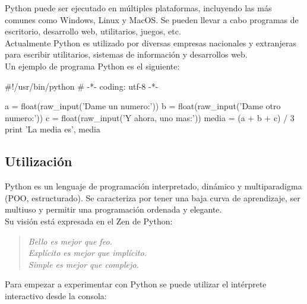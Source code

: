 Python puede ser ejecutado en múltiples plataformas, incluyendo las más comunes como Windows, Linux y MacOS. Se pueden llevar a cabo programas de escritorio, desarrollo web, utilitarios, juegos, etc.\\

Actualmente Python es utilizado por diversas empresas nacionales y extranjeras para escribir utilitarios, sistemas de información y desarrollos web.\\

Un ejemplo de programa Python es el siguiente:\\

\begin{pyglist}
#!/usr/bin/python
# -*- coding: utf-8 -*-

a = float(raw_input('Dame un numero:'))
b = float(raw_input('Dame otro numero:'))
c = float(raw_input('Y ahora, uno mas:'))
media = (a + b + c) / 3
print 'La media es', media                        
\end{pyglist}

\subsection{Utilización}

Python es un lenguaje de programación interpretado, dinámico y multiparadigma (POO, estructurado). Se caracteriza por tener una baja curva de aprendizaje, ser multiuso y permitir una programación ordenada y elegante.\\

Su visión está expresada en el Zen de Python:

\begin{center}
\begin{quote}
\textit{Bello es mejor que feo.\\
Explícito es mejor que implícito.\\
Simple es mejor que complejo.}
\end{quote}
\end{center}

Para empezar a experimentar con Python se puede utilizar el intérprete interactivo desde la consola:\\


